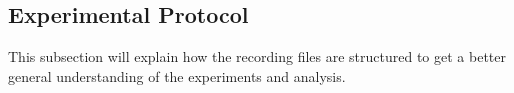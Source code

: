 \subsection{Experimental Protocol}
This subsection will explain how the recording files are structured to get a better general understanding of the experiments and analysis.

